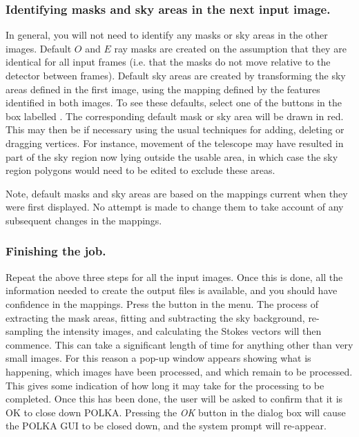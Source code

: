 \subsubsection {Identifying masks and sky areas in the next input image.}
In general, you will not need to identify any masks or sky areas in the
other images. Default $O$ and $E$ ray masks are created on the assumption
that they are identical for all input frames (i.e. that the masks do not
move relative to the detector between frames). Default sky areas are
created by transforming the sky areas defined in the first image, using
the mapping defined by the features identified in both images. To see
these defaults, select one of the buttons in the box labelled
. The corresponding default mask
or sky area will be drawn in red. This may then be
 if necessary using the
usual techniques for adding, deleting or dragging vertices. For instance,
movement of the telescope may have resulted in part of the sky region now
lying outside the usable area, in which case the sky region polygons would
need to be edited to exclude these areas.

Note, default masks and sky areas are based on the mappings current when
they were first displayed. No attempt is made to change them to take
account of any subsequent changes in the mappings.

\subsubsection {Finishing the job.}
Repeat the above three steps for all the input images. Once this is done,
all the information needed to create the output files is available, and
you should have confidence in the mappings. Press the  button in the 
menu. The process of extracting the mask areas, fitting and subtracting
the sky background, re-sampling the intensity images, and calculating the
Stokes vectors will then commence. This can take a significant length of
time for anything other than very small images. For this reason a pop-up
window appears showing what is happening, which images have been
processed, and which remain to be processed. This gives some indication
of how long it may take for the processing to be completed. Once this has
been done, the user will be asked to confirm that it is OK to close down
POLKA. Pressing the {\em OK} button in the dialog box will cause the
POLKA GUI to be closed down, and the system prompt will re-appear.


